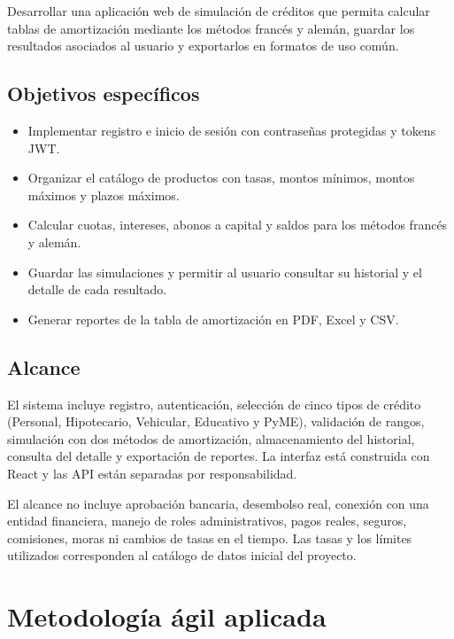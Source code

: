 \documentclass[12pt,a4paper]{article}
\begin{document}
Desarrollar una aplicación web de simulación de créditos que permita calcular
tablas de amortización mediante los métodos francés y alemán, guardar los
resultados asociados al usuario y exportarlos en formatos de uso común.

\subsection{Objetivos específicos}

\begin{itemize}[leftmargin=*]
    \item Implementar registro e inicio de sesión con contraseñas protegidas y tokens JWT.
    \item Organizar el catálogo de productos con tasas, montos mínimos, montos máximos y plazos máximos.
    \item Calcular cuotas, intereses, abonos a capital y saldos para los métodos francés y alemán.
    \item Guardar las simulaciones y permitir al usuario consultar su historial y el detalle de cada resultado.
    \item Generar reportes de la tabla de amortización en PDF, Excel y CSV.
\end{itemize}

\subsection{Alcance}

El sistema incluye registro, autenticación, selección de cinco tipos de crédito
(Personal, Hipotecario, Vehicular, Educativo y PyME), validación de rangos,
simulación con dos métodos de amortización, almacenamiento del historial,
consulta del detalle y exportación de reportes. La interfaz está construida
con React y las API están separadas por responsabilidad.

El alcance no incluye aprobación bancaria, desembolso real, conexión con una
entidad financiera, manejo de roles administrativos, pagos reales, seguros,
comisiones, moras ni cambios de tasas en el tiempo. Las tasas y los límites
utilizados corresponden al catálogo de datos inicial del proyecto.

\section{Metodología ágil aplicada}
\end{document}
